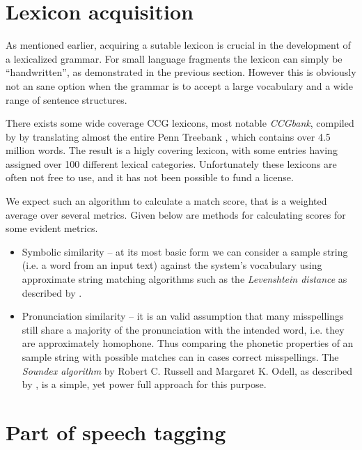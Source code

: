 \section{Lexicon acquisition}
\label{sec:lexiconAcquisition}
As mentioned earlier, acquiring a sutable lexicon is crucial in the development of a lexicalized grammar. For small language fragments the lexicon can simply be ``handwritten'', as demonstrated in the previous section. However this is obviously not an sane option when the grammar is to accept a large vocabulary and a wide range of sentence structures.

There exists some wide coverage CCG lexicons, most notable \emph{CCGbank}, compiled by \citeauthor{ccgBank}  by translating almost the entire Penn Treebank \cite{pennTreebank}, which contains over 4.5 million words. The result is a higly covering lexicon, with some entries having assigned over 100 different lexical categories. Unfortunately these lexicons are often not free to use, and it has not been possible to fund a license. 

We expect such an algorithm to calculate a match score, that is a weighted average over several metrics. Given below are methods for calculating scores for some evident metrics.

\begin{itemize}
  \item Symbolic similarity -- at its most basic form we can consider a sample string (i.e. a word from an input text) against the system's vocabulary using approximate string matching algorithms such as the  \emph{Levenshtein distance} as described by \cite{Wagner}.

  \item Pronunciation similarity -- it is an valid assumption that many misspellings still share a majority of the pronunciation with the intended word, i.e. they are approximately homophone. Thus comparing the phonetic properties of an sample string with possible matches can in cases correct misspellings. The \emph{Soundex algorithm} by Robert C. Russell and Margaret K. Odell, as described by \cite[p. 391–92]{ACP3}, is a simple, yet power full approach for this purpose.

\end{itemize}

\section{Part of speech tagging}

